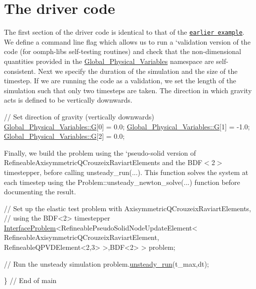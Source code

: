  

\hypertarget{index_main}{}\section{The driver code}\label{index_main}
The first section of the driver code is identical to that of the \href{../../../navier_stokes/two_layer_interface/html/index.html#main}{\tt earlier example}. We define a command line flag which allows us to run a `validation\textquotesingle{} version of the code (for {\ttfamily oomph-\/lib\textquotesingle{}s} self-\/testing routines) and check that the non-\/dimensional quantities provided in the {\ttfamily \hyperlink{namespaceGlobal__Physical__Variables}{Global\+\_\+\+Physical\+\_\+\+Variables}} namespace are self-\/consistent. Next we specify the duration of the simulation and the size of the timestep. If we are running the code as a validation, we set the length of the simulation such that only two timesteps are taken. The direction in which gravity acts is defined to be vertically downwards.


\begin{DoxyCodeInclude}
 \textcolor{comment}{// Set direction of gravity (vertically downwards)}
 \hyperlink{namespaceGlobal__Physical__Variables_af5ae275cf339105b9a54821c034df470}{Global\_Physical\_Variables::G}[0] = 0.0;
 \hyperlink{namespaceGlobal__Physical__Variables_af5ae275cf339105b9a54821c034df470}{Global\_Physical\_Variables::G}[1] = -1.0;
 \hyperlink{namespaceGlobal__Physical__Variables_af5ae275cf339105b9a54821c034df470}{Global\_Physical\_Variables::G}[2] = 0.0;

\end{DoxyCodeInclude}


Finally, we build the problem using the `pseudo-\/solid\textquotesingle{} version of {\ttfamily Refineable\+Axisymmetric\+Q\+Crouzeix\+Raviart\+Elements} and the {\ttfamily B\+D\+F$<$2$>$} timestepper, before calling {\ttfamily unsteady\+\_\+run}(...). This function solves the system at each timestep using the {\ttfamily Problem\+::unsteady\+\_\+newton\+\_\+solve}(...) function before documenting the result.


\begin{DoxyCodeInclude}
 \textcolor{comment}{// Set up the elastic test problem with AxisymmetricQCrouzeixRaviartElements,}
 \textcolor{comment}{// using the BDF<2> timestepper}
 \hyperlink{classInterfaceProblem}{InterfaceProblem}<RefineablePseudoSolidNodeUpdateElement<
 RefineableAxisymmetricQCrouzeixRaviartElement,
  RefineableQPVDElement<2,3> >,BDF<2> > problem;
   
 \textcolor{comment}{// Run the unsteady simulation}
 problem.\hyperlink{classInterfaceProblem_adf1f4e43d10939e4323e0e315b711085}{unsteady\_run}(t\_max,dt);

\} \textcolor{comment}{// End of main}

\end{DoxyCodeInclude}




